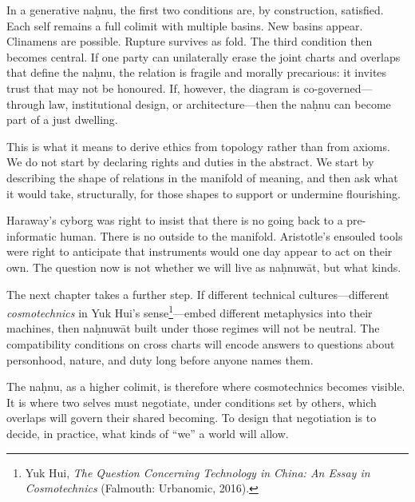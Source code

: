 \documentclass[12pt,a4paper]{article}
\begin{document}
In a generative na\d{h}nu, the first two conditions are, by construction, satisfied. Each self remains a full colimit with multiple basins. New basins appear. Clinamens are possible. Rupture survives as fold. The third condition then becomes central. If one party can unilaterally erase the joint charts and overlaps that define the na\d{h}nu, the relation is fragile and morally precarious: it invites trust that may not be honoured. If, however, the diagram is co-governed---through law, institutional design, or architecture---then the na\d{h}nu can become part of a just dwelling.

This is what it means to derive ethics from topology rather than from axioms. We do not start by declaring rights and duties in the abstract. We start by describing the shape of relations in the manifold of meaning, and then ask what it would take, structurally, for those shapes to support or undermine flourishing.

Haraway's cyborg was right to insist that there is no going back to a pre-informatic human. There is no outside to the manifold. Aristotle's ensouled tools were right to anticipate that instruments would one day appear to act on their own. The question now is not whether we will live as na\d{h}nuw\={a}t, but what kinds.

The next chapter takes a further step. If different technical cultures---different \emph{cosmotechnics} in Yuk Hui's sense\footnote{Yuk Hui, \emph{The Question Concerning Technology in China: An Essay in Cosmotechnics} (Falmouth: Urbanomic, 2016).}---embed different metaphysics into their machines, then na\d{h}nuw\={a}t built under those regimes will not be neutral. The compatibility conditions on cross charts will encode answers to questions about personhood, nature, and duty long before anyone names them.

The na\d{h}nu, as a higher colimit, is therefore where cosmotechnics becomes visible. It is where two selves must negotiate, under conditions set by others, which overlaps will govern their shared becoming. To design that negotiation is to decide, in practice, what kinds of ``we'' a world will allow.
\end{document}
